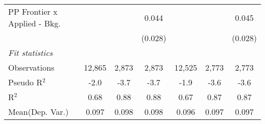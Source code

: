 \begin{tabular}{lcccccc}
   PP Frontier x Applied - Bkg.   &                &              & 0.044       &                &              & 0.045\\   
                                  &                &              & (0.028)     &                &              & (0.028)\\   
   \midrule
   \emph{Fit statistics}\\
   Observations                   & 12,865         & 2,873        & 2,873       & 12,525         & 2,773        & 2,773\\  
   Pseudo R$^2$                   & -2.0           & -3.7         & -3.7        & -1.9           & -3.6         & -3.6\\  
   R$^2$                          & 0.68           & 0.88         & 0.88        & 0.67           & 0.87         & 0.87\\  
Mean(Dep. Var.) & 0.097 & 0.098 & 0.098 & 0.096 & 0.097 & 0.097 \\
   

\end{tabular}
